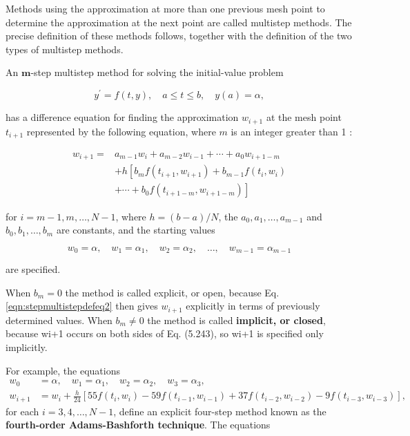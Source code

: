 Methods using the approximation at more than one previous mesh point to determine the approximation at the next point are called multistep methods. The precise definition of these methods follows, together with the definition of the two types of multistep methods.

\begin{definition}
An $\boldsymbol{m}$-step multistep method for solving the initial-value problem

\begin{equation}\label{eqn:stepmultistepdefeq1}
y^{\prime}=f(t, y), \quad a \leq t \leq b, \quad y(a)=\alpha,
\end{equation}

has a difference equation for finding the approximation $w_{i+1}$ at the mesh point $t_{i+1}$ represented by the following equation, where $m$ is an integer greater than 1 :


\begin{equation}\label{eqn:stepmultistepdefeq2}
\begin{split}
w_{i+1}= & a_{m-1} w_{i}+a_{m-2} w_{i-1}+\cdots+a_{0} w_{i+1-m} \\
& +h\left[b_{m} f\left(t_{i+1}, w_{i+1}\right)+b_{m-1} f\left(t_{i}, w_{i}\right)\right. \\
& \left.+\cdots+b_{0} f\left(t_{i+1-m}, w_{i+1-m}\right)\right] 
\end{split}
\end{equation}


for $i=m-1, m, \ldots, N-1$, where $h=(b-a) / N$, the $a_{0}, a_{1}, \ldots, a_{m-1}$ and $b_{0}, b_{1}, \ldots, b_{m}$ are constants, and the starting values

$$
w_{0}=\alpha, \quad w_{1}=\alpha_{1}, \quad w_{2}=\alpha_{2}, \quad \ldots, \quad w_{m-1}=\alpha_{m-1}
$$

are specified.
\end{definition}
When $b_{m}=0$ the method is called explicit, or open, because Eq. \ref{eqn:stepmultistepdefeq2} then gives $w_{i+1}$ explicitly in terms of previously determined values. When $b_{m} \neq 0$ the method is called {\bf implicit, or closed}, because wi+1 occurs on both sides of Eq. (5.243), so wi+1 is specified
 only implicitly.

 For example, the equations
\begin{equation}\label{eqn:multistepimplicitclosedeq1}
\begin{split}
w_0 &=\alpha,\quad w_1 =\alpha_1,\quad w_2 =\alpha_2,\quad w_3 =\alpha_3,\\
 w_{i+1} &= w_i + \frac{h}{24}[55f(t_i,w_i) - 59f(t_{i-1},w_{i-1}) + 37f(t_{i-2},w_{i-2}) − 9f(t_{i-3},w_{i-3})],
\end{split}
\end{equation}
for each $i = 3, 4, \ldots, N-1$, define an explicit four-step method known as the {\bf fourth-order Adams-Bashforth technique}. The equations

